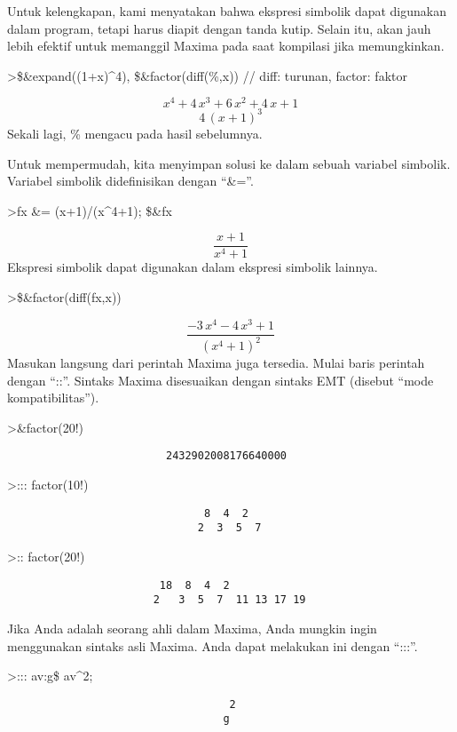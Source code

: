 \documentclass[
]{book}
\begin{document}
Untuk kelengkapan, kami menyatakan bahwa ekspresi simbolik dapat digunakan dalam program, tetapi harus diapit dengan tanda kutip. Selain itu, akan jauh lebih efektif untuk memanggil Maxima pada saat kompilasi jika memungkinkan.

\textgreater\$\&expand((1+x)\^{}4), \$\&factor(diff(\%,x)) // diff: turunan, factor: faktor

\[x^4+4\,x^3+6\,x^2+4\,x+1\]\[4\,\left(x+1\right)^3\]Sekali lagi, \% mengacu pada hasil sebelumnya.

Untuk mempermudah, kita menyimpan solusi ke dalam sebuah variabel simbolik. Variabel simbolik didefinisikan dengan ``\&=''.

\textgreater fx \&= (x+1)/(x\^{}4+1); \$\&fx

\[\frac{x+1}{x^4+1}\]Ekspresi simbolik dapat digunakan dalam ekspresi simbolik lainnya.

\textgreater\$\&factor(diff(fx,x))

\[\frac{-3\,x^4-4\,x^3+1}{\left(x^4+1\right)^2}\]Masukan langsung dari perintah Maxima juga tersedia. Mulai baris perintah dengan ``::''. Sintaks Maxima disesuaikan dengan sintaks EMT (disebut ``mode kompatibilitas'').

\textgreater\&factor(20!)

\begin{verbatim}
                         2432902008176640000
\end{verbatim}

\textgreater::: factor(10!)

\begin{verbatim}
                               8  4  2
                              2  3  5  7
\end{verbatim}

\textgreater:: factor(20!)

\begin{verbatim}
                        18  8  4  2
                       2   3  5  7  11 13 17 19
\end{verbatim}

Jika Anda adalah seorang ahli dalam Maxima, Anda mungkin ingin menggunakan sintaks asli Maxima. Anda dapat melakukan ini dengan ``:::''.

\textgreater::: av:g\$ av\^{}2;

\begin{verbatim}
                                   2
                                  g
\end{verbatim}
\end{document}
